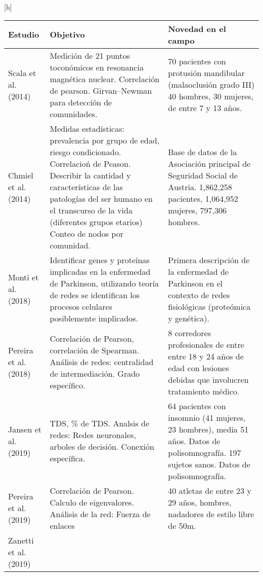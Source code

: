 \documentclass[twoside,twocolumn]{article}
\begin{document}
\begin{center}[h]
  \begin{longtable}{|p{}p{}p{}|}
    \hline
    \textbf{Estudio} & \textbf{Objetivo} & \textbf{Novedad en el campo} \\
    \hline
    Scala et al. (2014) \cite{scala2014complex}&
    Medición de 21 puntos toconómicos en resonancia magnética nuclear.
    Correlación de pearson.
    Girvan–Newman para detección de comunidades.
    &
    70 pacientes con protusión mandibular (malaoclusión grado III) 40 hombres, 30 mujeres, de entre 7 y 13 años.
    \\\hline
    Chmiel et al. (2014) \cite{chmiel2014spreading} &
    Medidas estadísticas: prevalencia por grupo de edad, riesgo condicionado.
    Correlacioń de Peason.
    Describir la cantidad y características de las patologías del ser humano en el transcurso de la vida (diferentes grupos etarios)
    Conteo de nodos por comunidad.
    &
    Base de datos de la Asociación principal de Seguridad Social de Austria. 1,862,258 pacientes, 1,064,952 mujeres, 797,306 hombres.
    \\\hline
    Monti et al. (2018) \cite{monti2018network} &
    Identificar genes y proteínas implicadas en la enfermedad de Parkinson, utilizando teoría de redes se identifican los procesos celulares posiblemente implicados. & Primera descripción de la enfermedad de Parkinson en el contexto de redes fisiológicas (proteómica y genética).
    \\\hline
    Pereira et al. (2018) \cite{pereira2018computational} &
    Correlación de Pearson, correlación de Spearman.
    Análisis de redes: centralidad de intermediación. Grado específico.
    &
    8 corredores profesionales de entre entre 18 y 24 años de edad con lesiones debidas que involucren tratamiento médico.
    \\\hline
    Jansen et al. (2019) \cite{jansen2019network} &
    TDS, \% de TDS.
    Analsis de redes: Redes neuronales, arboles de decisión. Conexión específica.
    &
    64 pacientes con insomnio (41 mujeres, 23 hombres), media 51 años. Datos de polisomnografía.
    197 sujetos sanos. Datos de polisomnografía.
    \\\hline
    Pereira et al. (2019) \cite{pereira2019complex} &
    Correlación de Pearson.
    Calculo de eigenvalores.
    Análisis de la red: Fuerza de enlaces
    &
    40 atletas de entre 23 y 29 años, hombres, nadadores de estilo libre de 50m.
    \\\hline
    Zanetti et al. (2019) \cite{zanetti2019information} &

\end{longtable}
\end{center}
\end{document}
